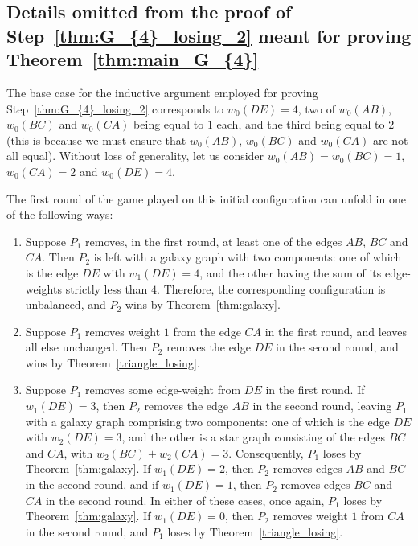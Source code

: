 \documentclass[11pt,reqno]{amsart}
\theoremstyle{definition}
\theoremstyle{definition}
\begin{document}
\subsection{Details omitted from the proof of Step~\eqref{thm:G_{4}_losing_2} meant for proving Theorem~\ref{thm:main_G_{4}}}\label{subsec:appendix_G_{4}_losing_2}
The base case for the inductive argument employed for proving Step~\eqref{thm:G_{4}_losing_2} corresponds to $w_{0}(DE)=4$, two of $w_{0}(AB)$, $w_{0}(BC)$ and $w_{0}(CA)$ being equal to $1$ each, and the third being equal to $2$ (this is because we must ensure that $w_{0}(AB)$, $w_{0}(BC)$ and $w_{0}(CA)$ are not all equal). Without loss of generality, let us consider $w_{0}(AB)=w_{0}(BC)=1$, $w_{0}(CA)=2$ and $w_{0}(DE)=4$.

The first round of the game played on this initial configuration can unfold in one of the following ways:
\begin{enumerate}
\item Suppose $P_{1}$ removes, in the first round, at least one of the edges $AB$, $BC$ and $CA$. Then $P_{2}$ is left with a galaxy graph with two components: one of which is the edge $DE$ with $w_{1}(DE)=4$, and the other having the sum of its edge-weights strictly less than $4$. Therefore, the corresponding configuration is unbalanced, and $P_{2}$ wins by Theorem~\ref{thm:galaxy}.  

\item Suppose $P_{1}$ removes weight $1$ from the edge $CA$ in the first round, and leaves all else unchanged. Then $P_{2}$ removes the edge $DE$ in the second round, and wins by Theorem~\ref{triangle_losing}.

\item Suppose $P_{1}$ removes some edge-weight from $DE$ in the first round. If $w_{1}(DE)=3$, then $P_{2}$ removes the edge $AB$ in the second round, leaving $P_{1}$ with a galaxy graph comprising two components: one of which is the edge $DE$ with $w_{2}(DE)=3$, and the other is a star graph consisting of the edges $BC$ and $CA$, with $w_{2}(BC)+w_{2}(CA)=3$. Consequently, $P_{1}$ loses by Theorem~\ref{thm:galaxy}. If $w_{1}(DE)=2$, then $P_{2}$ removes edges $AB$ and $BC$ in the second round, and if $w_{1}(DE)=1$, then $P_{2}$ removes edges $BC$ and $CA$ in the second round. In either of these cases, once again, $P_{1}$ loses by Theorem~\ref{thm:galaxy}. If $w_{1}(DE)=0$, then $P_{2}$ removes weight $1$ from $CA$ in the second round, and $P_{1}$ loses by Theorem~\ref{triangle_losing}.
\end{enumerate}
\end{document}
